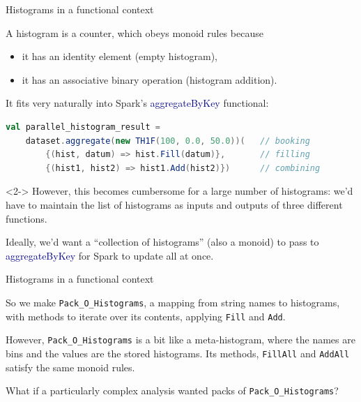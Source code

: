 \documentclass{beamer}
\begin{document}
\begin{frame}[fragile]{Histograms in a functional context}

A histogram is a counter, which obeys monoid rules because
\begin{itemize}
\item it has an identity element (empty histogram),
\item it has an associative binary operation (histogram addition).
\end{itemize}

\vfill
It fits very naturally into Spark's \textcolor{darkblue}{aggregateByKey} functional:

\begin{lstlisting}[language=scala]
val parallel_histogram_result =
    dataset.aggregate(new TH1F(100, 0.0, 50.0))(   // booking
        {(hist, datum) => hist.Fill(datum)},       // filling
        {(hist1, hist2) => hist1.Add(hist2)})      // combining
\end{lstlisting}

\vfill
\begin{uncoverenv}<2->
However, this becomes cumbersome for a large number of histograms: we'd have to maintain the list of histograms as inputs and outputs of three different functions.

\vfill
Ideally, we'd want a ``collection of histograms'' (also a monoid) to pass to \textcolor{darkblue}{aggregateByKey} for Spark to update all at once.
\end{uncoverenv}
\end{frame}

\begin{frame}{Histograms in a functional context}

So we make {\tt Pack\_O\_Histograms}, a mapping from string names to histograms, with methods to iterate over its contents, applying {\tt Fill} and {\tt Add}.

\vfill
However, {\tt Pack\_O\_Histograms} is a bit like a meta-histogram, where the names are bins and the values are the stored histograms. Its methods, {\tt FillAll} and {\tt AddAll} satisfy the same monoid rules.

\vfill
What if a particularly complex analysis wanted packs of {\tt Pack\_O\_Histograms}?
\end{frame}
\end{document}
